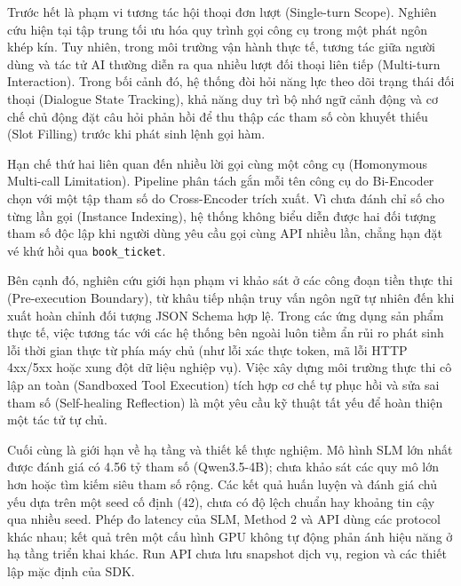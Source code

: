 Trước hết là phạm vi tương tác hội thoại đơn lượt (Single-turn Scope). Nghiên cứu hiện tại tập trung tối ưu hóa quy trình gọi công cụ trong một phát ngôn khép kín. Tuy nhiên, trong môi trường vận hành thực tế, tương tác giữa người dùng và tác tử AI thường diễn ra qua nhiều lượt đối thoại liên tiếp (Multi-turn Interaction). Trong bối cảnh đó, hệ thống đòi hỏi năng lực theo dõi trạng thái đối thoại (Dialogue State Tracking), khả năng duy trì bộ nhớ ngữ cảnh động và cơ chế chủ động đặt câu hỏi phản hồi để thu thập các tham số còn khuyết thiếu (Slot Filling) trước khi phát sinh lệnh gọi hàm.

Hạn chế thứ hai liên quan đến nhiều lời gọi cùng một công cụ (Homonymous Multi-call Limitation). Pipeline phân tách gắn mỗi tên công cụ do Bi-Encoder chọn với một tập tham số do Cross-Encoder trích xuất. Vì chưa đánh chỉ số cho từng lần gọi (Instance Indexing), hệ thống không biểu diễn được hai đối tượng tham số độc lập khi người dùng yêu cầu gọi cùng API nhiều lần, chẳng hạn đặt vé khứ hồi qua \texttt{book_ticket}.

Bên cạnh đó, nghiên cứu giới hạn phạm vi khảo sát ở các công đoạn tiền thực thi (Pre-execution Boundary), từ khâu tiếp nhận truy vấn ngôn ngữ tự nhiên đến khi xuất hoàn chỉnh đối tượng JSON Schema hợp lệ. Trong các ứng dụng sản phẩm thực tế, việc tương tác với các hệ thống bên ngoài luôn tiềm ẩn rủi ro phát sinh lỗi thời gian thực từ phía máy chủ (như lỗi xác thực token, mã lỗi HTTP 4xx/5xx hoặc xung đột dữ liệu nghiệp vụ). Việc xây dựng môi trường thực thi cô lập an toàn (Sandboxed Tool Execution) tích hợp cơ chế tự phục hồi và sửa sai tham số (Self-healing Reflection) là một yêu cầu kỹ thuật tất yếu để hoàn thiện một tác tử tự chủ.

Cuối cùng là giới hạn về hạ tầng và thiết kế thực nghiệm. Mô hình SLM lớn nhất được đánh giá có 4.56 tỷ tham số (Qwen3.5-4B); chưa khảo sát các quy mô lớn hơn hoặc tìm kiếm siêu tham số rộng. Các kết quả huấn luyện và đánh giá chủ yếu dựa trên một seed cố định (42), chưa có độ lệch chuẩn hay khoảng tin cậy qua nhiều seed. Phép đo latency của SLM, Method 2 và API dùng các protocol khác nhau; kết quả trên một cấu hình GPU không tự động phản ánh hiệu năng ở hạ tầng triển khai khác. Run API chưa lưu snapshot dịch vụ, region và các thiết lập mặc định của SDK.


